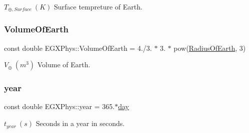 $T_{\oplus,Surface}\ (K)$ Surface tempreture of Earth. \mbox{\label{namespace_e_g_x_phys_a73aaaddeacf5d59643ec5e4a53a1a251}} 
\subsubsection{\texorpdfstring{Volume\+Of\+Earth}{VolumeOfEarth}}
{\footnotesize\ttfamily const double E\+G\+X\+Phys\+::\+Volume\+Of\+Earth = 4./3. $\ast$ 3. $\ast$ pow(\hyperlink{namespace_e_g_x_phys_a11a2d4a914eb43c4095e225358293a45}{Radius\+Of\+Earth}, 3)}

$V_\oplus\ (m^3)$ Volume of Earth. \mbox{\label{namespace_e_g_x_phys_afee9eebc1da4a1db2198fe0c45bcb53f}} 
\subsubsection{\texorpdfstring{year}{year}}
{\footnotesize\ttfamily const double E\+G\+X\+Phys\+::year = 365.$\ast$\hyperlink{namespace_e_g_x_phys_a24d985ae6f6cefe7e25ac40806b88f79}{day}}

$t_{year}\ (s)$ Seconds in a year in seconds. 